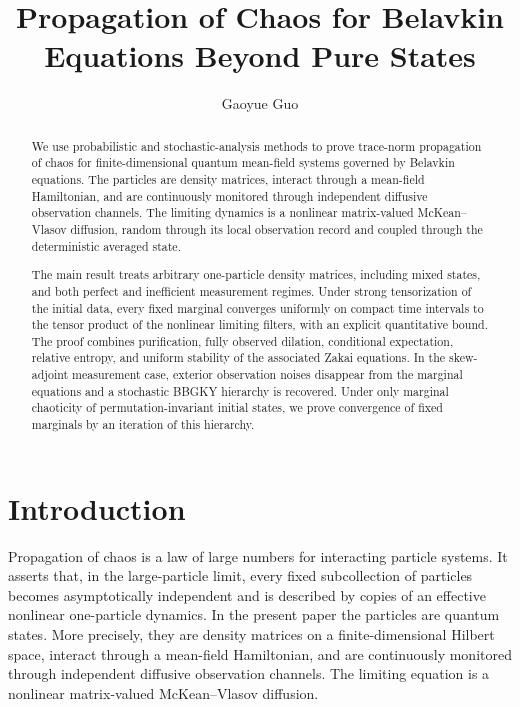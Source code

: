 \documentclass[10pt,a4paper,reqno]{amsart}
\title[Belavkin equations beyond pure states]
{Propagation of Chaos for Belavkin Equations Beyond Pure States}
\author[G. Guo]{Gaoyue Guo}
\numberwithin{equation}{section}
\theoremstyle{plain}
\theoremstyle{definition}
\theoremstyle{remark}
\newcommand{\1}{\mathbf 1}
\begin{document}
\begin{abstract}
We use probabilistic and stochastic-analysis methods to prove trace-norm
propagation of chaos for finite-dimensional quantum mean-field systems governed
by Belavkin equations.  The particles are density matrices,
interact through a mean-field Hamiltonian, and are continuously monitored
through independent diffusive observation channels.  The limiting dynamics is a
nonlinear matrix-valued McKean--Vlasov diffusion, random through its local
observation record and coupled through the deterministic averaged state.

The main result treats arbitrary one-particle density matrices, including mixed
states, and both perfect and inefficient measurement regimes.  Under strong
tensorization of the initial data, every fixed marginal converges uniformly on
compact time intervals to the tensor product of the nonlinear limiting filters,
with an explicit quantitative bound.  The proof combines purification, fully
observed dilation, conditional expectation, relative entropy, and uniform
stability of the associated Zakai equations.  In the skew-adjoint measurement
case, exterior observation noises disappear from the marginal equations and a
stochastic BBGKY hierarchy is recovered.  Under only marginal chaoticity of
permutation-invariant initial states, we prove convergence of fixed marginals by
an iteration of this hierarchy.
\end{abstract}

\maketitle

\setcounter{tocdepth}{2}\tableofcontents





\section{Introduction}
\label{sec:introduction}

Propagation of chaos is a law of large numbers for interacting particle
systems.  It asserts that, in the large-particle limit, every fixed
subcollection of particles becomes asymptotically independent and is described
by copies of an effective nonlinear one-particle dynamics.  In the present
paper the particles are quantum states.  More precisely, they are density
matrices on a finite-dimensional Hilbert space, interact through a mean-field
Hamiltonian, and are continuously monitored through independent diffusive
observation channels.  The limiting equation is a nonlinear matrix-valued
McKean--Vlasov diffusion.
\end{document}
